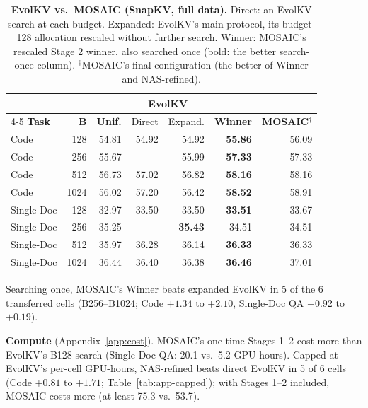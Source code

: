 \documentclass[11pt]{article}
\begin{document}
\begin{table}[t]
  \centering
  \footnotesize
  \setlength{\tabcolsep}{1.5pt}
  \begin{tabular}{@{} l r r r r r r @{}}
    \toprule
    & & & \multicolumn{2}{c}{\textbf{EvolKV}} & & \\
    \cmidrule(lr){4-5}
    \textbf{Task} & \textbf{B} & \textbf{Unif.} & Direct & Expand. & \textbf{Winner} & \textbf{MOSAIC}$^\dagger$ \\
    \midrule
    \rowcolor{gray!10}
    Code       & 128  & 54.81 & 54.92 & 54.92 & \textbf{55.86} & 56.09 \\
    Code       & 256  & 55.67 & --    & 55.99 & \textbf{57.33} & 57.33 \\
    \rowcolor{gray!10}
    Code       & 512  & 56.73 & 57.02 & 56.82 & \textbf{58.16} & 58.16 \\
    Code       & 1024 & 56.02 & 57.20 & 56.42 & \textbf{58.52} & 58.91 \\
    \rowcolor{gray!10}
    Single-Doc & 128  & 32.97 & 33.50 & 33.50 & \textbf{33.51} & 33.67 \\
    Single-Doc & 256  & 35.25 & --    & \textbf{35.43} & 34.51 & 34.51 \\
    \rowcolor{gray!10}
    Single-Doc & 512  & 35.97 & 36.28 & 36.14 & \textbf{36.33} & 36.33 \\
    Single-Doc & 1024 & 36.44 & 36.40 & 36.38 & \textbf{36.46} & 37.01 \\
    \bottomrule
  \end{tabular}
  \caption{\textbf{EvolKV vs.\ MOSAIC (SnapKV, full data).} Direct: an EvolKV search at each budget. Expanded: EvolKV's main protocol, its budget-128 allocation rescaled without further search. Winner: MOSAIC's rescaled Stage 2 winner, also searched once (bold: the better search-once column). $^\dagger$MOSAIC's final configuration (the better of Winner and NAS-refined).}
  \label{tab:ablation}
\end{table}

Searching once, MOSAIC's Winner beats expanded EvolKV in 5 of the 6 transferred cells (B256--B1024; Code $+1.34$ to $+2.10$, Single-Doc QA $-0.92$ to $+0.19$). 

\textbf{Compute} (Appendix~\ref{app:cost}). MOSAIC's one-time Stages 1--2 cost more than EvolKV's B128 search (Single-Doc QA: 20.1 vs.\ 5.2 GPU-hours). Capped at EvolKV's per-cell GPU-hours, NAS-refined beats direct EvolKV in 5 of 6 cells (Code $+0.81$ to $+1.71$; Table~\ref{tab:app-capped}); with Stages 1--2 included, MOSAIC costs more (at least 75.3 vs.\ 53.7).
\end{document}
